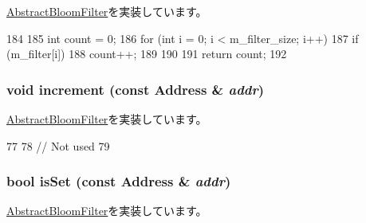 \hyperlink{classAbstractBloomFilter_a25ea5e1ef3d4911226f37649b6efed22}{AbstractBloomFilter}を実装しています。


\begin{DoxyCode}
184 {
185     int count = 0;
186     for (int i = 0; i < m_filter_size; i++) {
187         if (m_filter[i]) {
188             count++;
189         }
190     }
191     return count;
192 }
\end{DoxyCode}
\hypertarget{classBulkBloomFilter_a3e860ad851b771ac3b6eeb1716eb56bc}{
\subsubsection[{increment}]{\setlength{\rightskip}{0pt plus 5cm}void increment (const {\bf Address} \& {\em addr})}}
\label{classBulkBloomFilter_a3e860ad851b771ac3b6eeb1716eb56bc}


\hyperlink{classAbstractBloomFilter_af795f7fdeff0174e914ed1d792ffe4ff}{AbstractBloomFilter}を実装しています。


\begin{DoxyCode}
77 {
78     // Not used
79 }
\end{DoxyCode}
\hypertarget{classBulkBloomFilter_a4200ee289c3d941a4b209c4788f8087c}{
\subsubsection[{isSet}]{\setlength{\rightskip}{0pt plus 5cm}bool isSet (const {\bf Address} \& {\em addr})}}
\label{classBulkBloomFilter_a4200ee289c3d941a4b209c4788f8087c}


\hyperlink{classAbstractBloomFilter_aa1b69d102655f8c5879b3df95eb205dc}{AbstractBloomFilter}を実装しています。



